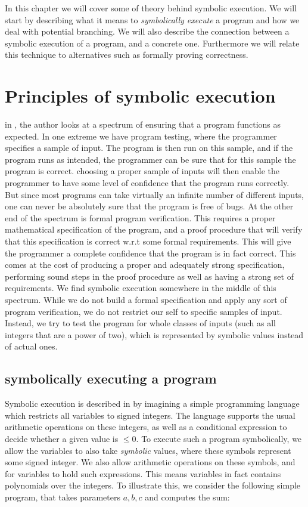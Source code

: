 In this chapter we will cover some of theory behind symbolic execution. We will start by describing what it means to \emph{symbolically execute} a program and how we deal with potential branching. We will also describe the connection between a symbolic execution of a program, and a concrete one. Furthermore we will relate this technique to alternatives such as formally proving correctness. 

\section{Principles of symbolic execution }
	in \cite{king76}, the author looks at a spectrum of ensuring that a program functions as expected. In one extreme we have program testing, where the programmer specifies a sample of input. The program is then run on this sample, and if the program runs as intended, the programmer can be sure that for this sample the program is correct. choosing a proper sample of inputs will then enable the programmer to have some level of confidence that the program runs correctly. But since most programs can take virtually an infinite number of different inputs, one can never be absolutely sure that the program is free of bugs. At the other end of the spectrum is formal program verification. 
	This requires a proper mathematical specification of the program, and a proof procedure that will verify that this specification is correct w.r.t some formal requirements. 
	This will give the programmer a complete confidence that the program is in fact correct. This comes at the cost of producing a proper and adequately strong specification, performing sound steps in the proof procedure as well as having a strong set of requirements. 
	We find symbolic execution somewhere in the middle of this spectrum. While we do not build a formal specification and apply any sort of program verification, we do not restrict our self to specific samples of input. Instead, we try to test the program for whole classes of inputs (such as all integers that are a power of two), which is represented by symbolic values instead of actual ones.

\subsection{symbolically executing a program}
	
	Symbolic execution is described in \cite{king76} by imagining a simple programming language which restricts all variables to signed integers. The language supports the usual arithmetic operations on these integers, as well as a conditional expression to decide whether a given value is $ \leq 0$. To execute such a program symbolically, we allow the variables to also take \emph{symbolic} values, where these symbols represent some signed integer. We also allow arithmetic operations on these symbols, and for variables to hold such expressions. This means variables in fact contains polynomials over the integers.
	To illustrate this, we consider the following simple program, that takes parameters $a, b, c$ and computes the sum:
	
